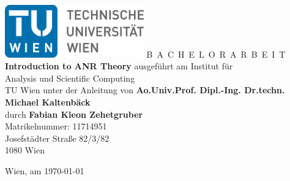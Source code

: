 

\begin{titlepage}
  \begin{center}
    \includegraphics[width=0.45\textwidth]{TULogo.eps}
    \vskip 1cm%
    {\LARGE B~\Large A~C~H~E~L~O~R~A~R~B~E~I~T}
    \vskip 8mm
    {\huge\bfseries Introduction to ANR Theory}
    \vskip 1cm
    \large 
    ausgef\"uhrt am    
    \vskip 0.75cm
    {\Large Institut f\"ur\\[1ex] Analysis und Scientific Computing}\\[1ex]
    {\Large TU Wien}
    \vskip0.75cm
    unter der Anleitung von
    \vskip0.75cm
    {\Large\bfseries Ao.Univ.Prof. Dipl.-Ing. Dr.techn. Michael Kaltenbäck}\\[1ex]
    \vskip 0.5cm
    durch
    \vskip 0.5cm
    {\Large\bfseries Fabian Kleon Zehetgruber}\\[1ex]
    Matrikelnummer: {11714951}\\[1ex]
    {Josefstädter Straße 82/3/82}\\[1ex]
    {1080 Wien}
  \end{center}
  
  \vfill
  
  \small
  Wien, am \today %
  \vspace*{-15mm}
\end{titlepage}

\cleardoublepage